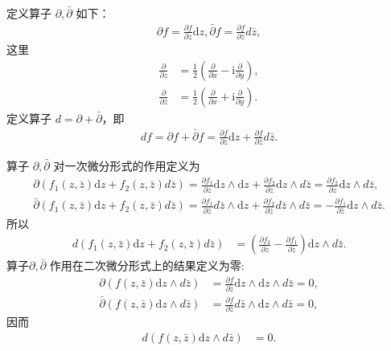 \documentclass[../../main.tex]{subfiles}
\begin{document}
\begin{definition}
定义算子 \( \partial,\bar{\partial} \) 如下：
\begin{align*}
\partial f = \frac{\partial f}{\partial z}\mathrm{d}z, 
\bar{\partial} f = \frac{\partial f}{\partial \bar{z}}d\bar{z},
\end{align*}
这里
\begin{align*}
\frac{\partial}{\partial z} &= \frac{1}{2}\left( \frac{\partial}{\partial x} - \text{i}\frac{\partial}{\partial y} \right), \\
\frac{\partial}{\partial \overline{z}} &= \frac{1}{2}\left( \frac{\partial}{\partial x} + \text{i}\frac{\partial}{\partial y} \right).
\end{align*}
定义算子 \( d = \partial + \bar{\partial} \)，即
\begin{align}
df = \partial f + \bar{\partial} f = \frac{\partial f}{\partial z}\mathrm{d}z + \frac{\partial f}{\partial \bar{z}}d\bar{z}. \label{eq:1}
\end{align}
\end{definition}

\begin{definition}
算子 \( \partial,\bar{\partial} \) 对一次微分形式的作用定义为
\begin{gather*}
\partial(f_1(z,\bar{z})\mathrm{d}z + f_2(z,\bar{z})d\bar{z}) = \frac{\partial f_1}{\partial z}\mathrm{d}z \wedge \mathrm{d}z + \frac{\partial f_2}{\partial z}\mathrm{d}z \wedge d\bar{z} = \frac{\partial f_2}{\partial z}\mathrm{d}z \wedge d\bar{z},
\\
\bar{\partial}(f_1(z,\bar{z})\mathrm{d}z + f_2(z,\bar{z})d\bar{z}) = \frac{\partial f_1}{\partial \bar{z}}d\bar{z} \wedge \mathrm{d}z + \frac{\partial f_2}{\partial \bar{z}}d\bar{z} \wedge d\bar{z} = -\frac{\partial f_1}{\partial \bar{z}}\mathrm{d}z \wedge d\bar{z}.
\end{gather*}
所以
\begin{align}
d(f_1(z,\bar{z})\mathrm{d}z + f_2(z,\bar{z})d\bar{z}) &= \left( \frac{\partial f_2}{\partial z} - \frac{\partial f_1}{\partial \bar{z}} \right) \mathrm{d}z \wedge d\bar{z}. \label{eq:2}
\end{align}
算子\( \partial,\bar{\partial} \) 作用在二次微分形式上的结果定义为零:
\begin{align*}
\partial(f(z,\bar{z})\mathrm{d}z \wedge d\bar{z}) &= \frac{\partial f}{\partial z}\mathrm{d}z \wedge \mathrm{d}z \wedge d\bar{z} = 0, \\
\bar{\partial}(f(z,\bar{z})\mathrm{d}z \wedge d\bar{z}) &= \frac{\partial f}{\partial \bar{z}}d\bar{z} \wedge \mathrm{d}z \wedge d\bar{z} = 0,
\end{align*}
因而
\begin{align}
d(f(z,\bar{z})\mathrm{d}z \wedge d\bar{z}) &= 0. \label{eq:3}
\end{align}
\end{definition}
\end{document}
